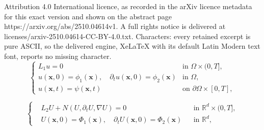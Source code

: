 \documentclass[10pt,a4paper]{amsart}
\begin{document}
Attribution 4.0 International licence, as recorded in the arXiv licence metadata for this exact version and shown on the abstract page https://arxiv.org/abs/2510.04614v1. A full rights notice is delivered at licenses/arxiv-2510.04614-CC-BY-4.0.txt. Characters: every retained excerpt is pure ASCII, so the delivered engine, XeLaTeX with its default Latin Modern text font, reports no missing character.
	\begin{equation}\label{1.1}
		\begin{cases}
			L_1u = 0 & \text{in } \Omega \times (0,T], \\
			u(\mathbf{x},0) = \phi_1(\mathbf{x}), \quad \partial_t u(\mathbf{x},0) = \phi_2(\mathbf{x}) & \text{in } \Omega, \\
			u(\mathbf{x},t) = \psi(\mathbf{x},t) & \text{on } \partial\Omega \times [0,T],
		\end{cases}
	\end{equation}

	\begin{equation}\label{1.2}
		\left\{
		\begin{aligned}
			&L_2U + N(U,\partial_{t}U,\nabla U) = 0 
			&& \text{in } \mathbb{R}^{d} \times (0,T], \\
			&U(\mathbf{x},0) = \Phi_1(\mathbf{x}), \quad \partial_t U(\mathbf{x},0) = \Phi_2(\mathbf{x}) 
			&& \text{in } \mathbb{R}^d,
		\end{aligned}
		\right.
	\end{equation}
\end{document}
